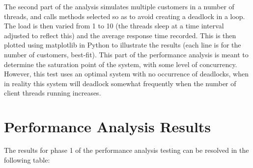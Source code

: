 \documentclass[letterpaper,12pt]{article}
\begin{document}
The second part of the analysis simulates multiple customers in a number of threads, and calls methods selected so as to avoid creating a deadlock in a loop. The load is then varied from 1 to 10 (the threads sleep at a time interval adjusted to reflect this) and the average response time recorded. This is then plotted using matplotlib in Python to illustrate the results (each line is for the number of customers, best-fit). This part of the performance analysis is meant to determine the saturation point of the system, with some level of concurrency. However, this test uses an optimal system with no occurrence of deadlocks, when in reality this system will deadlock somewhat frequently when the number of client threads running increases. 


\section{ Performance Analysis Results}
The results for phase 1 of the performance analysis testing can be resolved in the following table:
\end{document}
